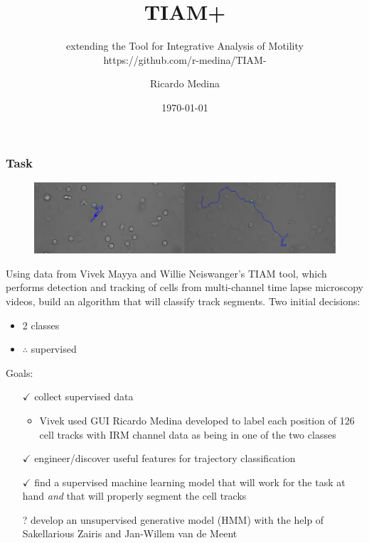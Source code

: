 \documentclass[8pt]{beamer}
\begin{document}
\title{TIAM+}
\subtitle{extending the Tool for Integrative Analysis of Motility\\ https://github.com/r-medina/TIAM-}
\author{Ricardo Medina}
\date{\today}

\frame{\titlepage}

\begin{frame}
  \frametitle{Task}
  \begin{figure}[H]\centering
    \includegraphics[width=.8\textwidth]{../fig/two_classes.png}
  \end{figure}
  Using data from Vivek Mayya and Willie Neiswanger's TIAM tool, which
  performs detection and tracking of cells from multi-channel time
  lapse microscopy videos, build an algorithm that will classify track
  segments. Two initial decisions:
  \begin{itemize}
  \item 2 classes
  \item $\therefore$ supervised
  \end{itemize}
  Goals:
  \begin{itemize}
  \item [$\checkmark$] collect supervised data
    \begin{itemize}
    \item Vivek used GUI Ricardo Medina developed to label each
      position of 126 cell tracks with IRM channel data as being in
      one of the two classes
    \end{itemize}
  \item [$\checkmark$] engineer/discover useful features for trajectory
    classification
  \item [$\checkmark$] find a supervised machine learning model that will work for
    the task at hand \emph{and} that will properly segment the cell tracks
  \item [?] develop an unsupervised generative model (HMM) with the help of Sakellarious Zairis and Jan-Willem van de Meent
  \end{itemize}
\end{frame}
\end{document}
